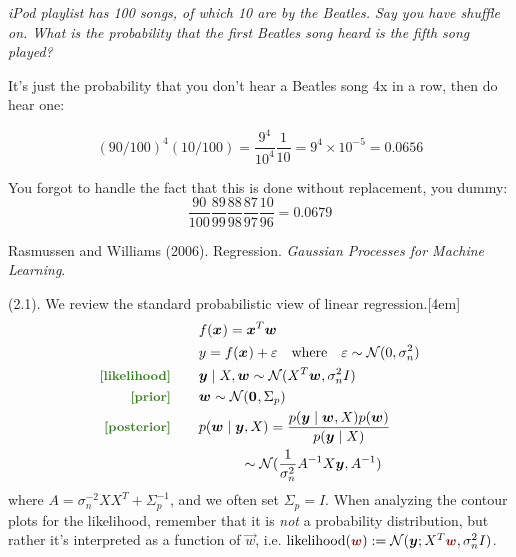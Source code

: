 \documentclass[11pt]{article}
\begin{document}
\begin{example}[Exercise 35]
	{\small\itshape iPod playlist has 100 songs, of which 10 are by the Beatles. Say you have shuffle on. What is the probability that the first Beatles song heard is the fifth song played?}
	
	\tcblower
	
	It's just the probability that you don't hear a Beatles song 4x in a row, then do hear one:
	
	$$
	(90/100)^4 (10/100) = \frac{9^4}{10^4}\frac{1}{10} = 9^4 \times 10^{-5} = 0.0656
	$$
	
	\red{[wrong]} You forgot to handle the fact that this is done without replacement, you dummy:
	$$
	\frac{90}{100}\frac{89}{99}\frac{88}{98}\frac{87}{97}\frac{10}{96} = 0.0679
	$$
	
\end{example}



























\label{Gaussian Processes for Machine Learning}

\vspace{-1.7em}
{\scriptsize Rasmussen and Williams (2006). Regression. \textit{Gaussian Processes for Machine Learning}.\\ }

\p {} (2.1). We review the standard probabilistic view of linear regression.[4em]
\begin{align}
	&f(\vec x)
		= \vec{x}^T \vec w \\
	&y 
		= f(\vec x) + \varepsilon  \quad \text{where}
			\quad \varepsilon \sim \mathcal{N}(0, \sigma_n^2) \\
	\mtgreen{[likelihood]} \qquad &\vec y \mid X, \vec w 
		\sim \mathcal{N}(X^T\vec w, \sigma_n^2 I) \\
	\mtgreen{[prior]} \qquad &\vec w 
		\sim \mathcal{N}(\vec 0, \Sigma_p) \\
	\mtgreen{[posterior]} \qquad &p(\vec w \mid \vec y, X)
		= \frac{ p(\vec y \mid \vec w, X) p(\vec w)  }{ p(\vec y \mid X)  } \\
		&\quad\qquad \sim \mathcal{N}(\inv{\sigma_n^2} A^{-1} X \vec y, A^{-1})
\end{align}
where $A = \sigma_n^{-2} X X^T + \Sigma_p^{-1}$, and we often set $\Sigma_p = I$. When analyzing the contour plots for the likelihood, remember that it is \textit{not} a probability distribution, but rather it's interpreted as a function of $\vec w$, i.e. $\text{likelihood}(\mred{\vec w}) := \mathcal{N}(\vec y; X^T \mred{\vec w}, \sigma_n^2 I)$.\\
\end{document}
